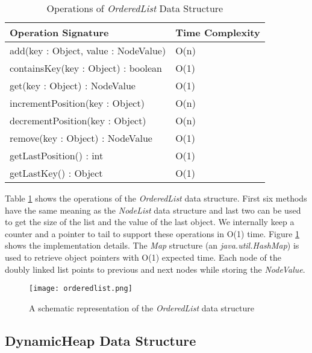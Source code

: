 \begin{table}
\centering
\caption{Operations of \textit{OrderedList} Data Structure}
\begin{tabular}{|l|l|} \hline
Operation Signature & Time Complexity \\ \hline \hline
add(key : Object, value : NodeValue) & O(n) \\ \hline
containsKey(key : Object) : boolean & O(1) \\ \hline
get(key : Object) : NodeValue & O(1) \\ \hline
incrementPosition(key : Object) & O(n) \\ \hline
decrementPosition(key : Object) & O(n) \\ \hline
remove(key : Object) : NodeValue & O(1) \\ \hline
getLastPosition() : int & O(1) \\ \hline
getLastKey() : Object & O(1) \\ \hline
\end{tabular}
\label{orderedlist_api}
\end{table}

Table \ref{orderedlist_api} shows the operations of the \textit{OrderedList} data structure. First six methods have the same meaning as the \textit{NodeList} data structure and last two can be used to get the size of the list and the value of the last object. We internally keep a counter and a pointer to tail to support these operations in O(1) time. Figure \ref{orderedlist_impl} shows the implementation details. The \textit{Map} structure (an \textit{java.util.HashMap}) is used to retrieve object pointers with O(1) expected time. Each node of the doubly linked list points to previous and next nodes while storing the \textit{NodeValue}.


\begin{figure}[!t]
        \centering
        \texttt{[image: orderedlist.png]}
        \caption {A schematic representation of the \textit{OrderedList} data structure}
        \label{orderedlist_impl}
\end{figure}

\subsection{DynamicHeap Data Structure}

